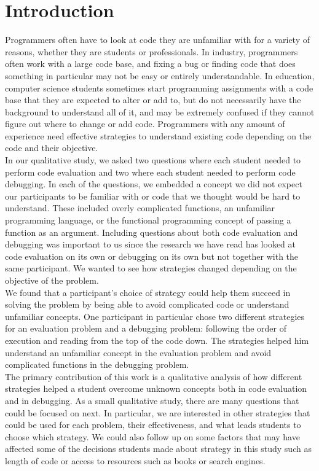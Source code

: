 \section{Introduction}

Programmers often have to look at code they are unfamiliar with for a variety of reasons, whether they are students or professionals.
In industry, programmers often work with a large code base, and fixing a bug or finding code that does something in particular may not be easy or entirely understandable.
In education, computer science students sometimes start programming assignments with a code base that they are expected to alter or add to, but do not necessarily have the background to understand all of it, and may be extremely confused if they cannot figure out where to change or add code.
Programmers with any amount of experience need effective strategies to understand existing code depending on the code and their objective. \\

In our qualitative study, we asked two questions where each student needed to perform code evaluation and two where each student needed to perform code debugging.
In each of the questions, we embedded a concept we did not expect our participants to be familiar with or code that we thought would be hard to understand.
These included overly complicated functions, an unfamiliar programming language, or the functional programming concept of passing a function as an argument.
Including questions about both code evaluation and debugging was important to us since the research we have read has looked at code evaluation on its own or debugging on its own but not together with the same participant.
We wanted to see how strategies changed depending on the objective of the problem. \\

We found that a participant's choice of strategy could help them succeed in solving the problem by being able to avoid complicated code or understand unfamiliar concepts.
One participant in particular chose two different strategies for an evaluation problem and a debugging problem: following the order of execution and reading from the top of the code down.
The strategies helped him understand an unfamiliar concept in the evaluation problem and avoid complicated functions in the debugging problem. \\

The primary contribution of this work is a qualitative analysis of how different strategies helped a student overcome unknown concepts both in code evaluation and in debugging.
As a small qualitative study, there are many questions that could be focused on next.
In particular, we are interested in other strategies that could be used for each problem, their effectiveness, and what leads students to choose which strategy.
We could also follow up on some factors that may have affected some of the decisions students made about strategy in this study such as length of code or access to resources such as books or search engines.\\

